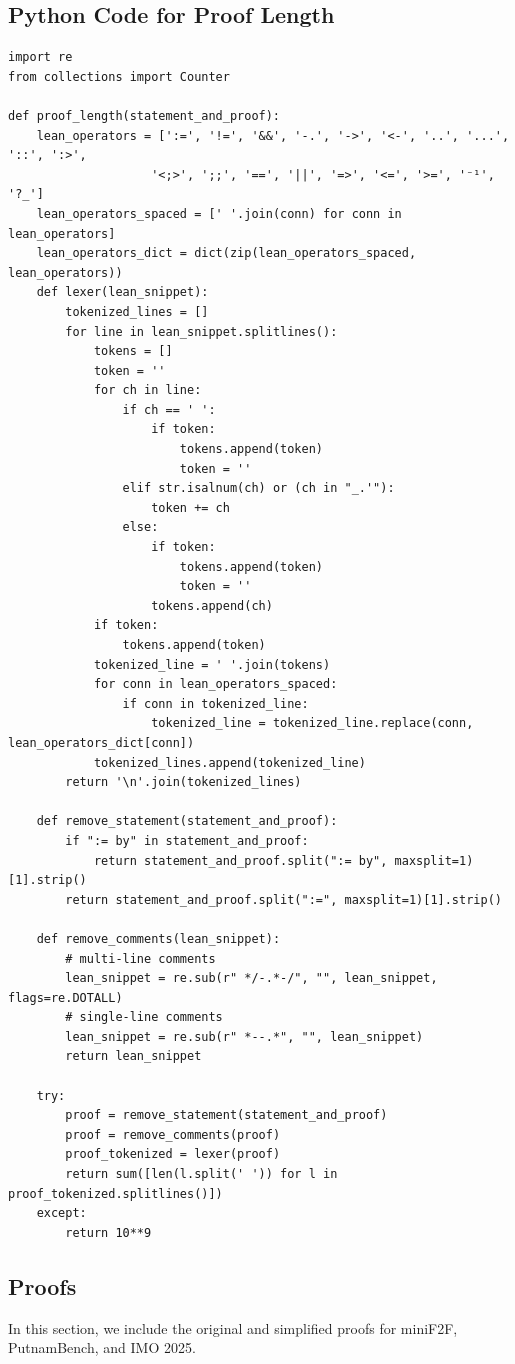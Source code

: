 \subsection{Python Code for Proof Length}
\begin{lstlisting}[breaklines=true, style=mystyle, language=lean]
import re
from collections import Counter

def proof_length(statement_and_proof):
    lean_operators = [':=', '!=', '&&', '-.', '->', '<-', '..', '...', '::', ':>',
                    '<;>', ';;', '==', '||', '=>', '<=', '>=', '⁻¹', '?_']
    lean_operators_spaced = [' '.join(conn) for conn in lean_operators]
    lean_operators_dict = dict(zip(lean_operators_spaced, lean_operators))
    def lexer(lean_snippet):
        tokenized_lines = []
        for line in lean_snippet.splitlines():
            tokens = []
            token = ''
            for ch in line:
                if ch == ' ':
                    if token:
                        tokens.append(token)
                        token = ''
                elif str.isalnum(ch) or (ch in "_.'"):
                    token += ch
                else:
                    if token:
                        tokens.append(token)
                        token = ''
                    tokens.append(ch)
            if token:
                tokens.append(token)
            tokenized_line = ' '.join(tokens)
            for conn in lean_operators_spaced:
                if conn in tokenized_line:
                    tokenized_line = tokenized_line.replace(conn, lean_operators_dict[conn])
            tokenized_lines.append(tokenized_line)
        return '\n'.join(tokenized_lines)

    def remove_statement(statement_and_proof):
        if ":= by" in statement_and_proof:
            return statement_and_proof.split(":= by", maxsplit=1)[1].strip()
        return statement_and_proof.split(":=", maxsplit=1)[1].strip()

    def remove_comments(lean_snippet):
        # multi-line comments
        lean_snippet = re.sub(r" */-.*-/", "", lean_snippet, flags=re.DOTALL)
        # single-line comments
        lean_snippet = re.sub(r" *--.*", "", lean_snippet)
        return lean_snippet

    try:
        proof = remove_statement(statement_and_proof)
        proof = remove_comments(proof)
        proof_tokenized = lexer(proof)
        return sum([len(l.split(' ')) for l in proof_tokenized.splitlines()])
    except:
        return 10**9
\end{lstlisting}

\newpage
\subsection{Proofs}
In this section, we include the original and simplified proofs for miniF2F, PutnamBench, and IMO 2025.
